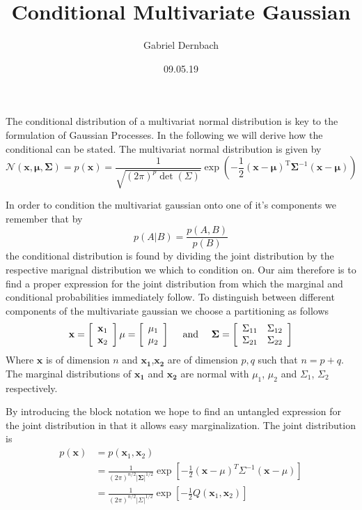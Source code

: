 \documentclass{article}
\title{Conditional Multivariate Gaussian}
\author{Gabriel Dernbach}
\date{09.05.19}
\begin{document}
\maketitle

The conditional distribution of a multivariat normal distribution is key to the formulation of Gaussian Processes. In the following we will derive how the conditional can be stated.
\bigbreak
The multivariat normal distribution is given by
$$\mathcal{N}(\boldsymbol{x},\boldsymbol{\mu}, \mathbf{\Sigma})
= p(\mathbf{x}) = \frac{1}{\sqrt{(2 \pi)^{p} \operatorname{det}(\Sigma)}} \exp \left(-\frac{1}{2}(\mathbf{x}-\boldsymbol{\mu})^{\mathrm{T}} \mathbf{\Sigma}^{-1}(\mathbf{x}-\boldsymbol{\mu})\right)$$

In order to condition the multivariat gaussian onto one of it's components we remember that by
$$p(A|B) = \frac{p(A,B)}{p(B)}$$
the conditional distribution is found by dividing the joint distribution by the respective marignal distribution we which to condition on. Our aim therefore is to find a proper expression for the joint distribution from which the marginal and conditional probabilities immediately follow. 
\bigbreak
To distinguish between different components of the multivariate gaussian we choose a partitioning as follows
$$\mathbf{x}=\left[ \begin{array}{l}{\mathbf{x}_{1}} \\ {\mathbf{x}_{2}}\end{array}\right] \\ \mu=\left[ \begin{array}{c}{\mu_{1}} \\ {\mu_{2}}\end{array}\right] \quad \text { and } \quad {\mathbf{\Sigma}}=\left[ \begin{array}{cc}{\Sigma_{11}} & {\Sigma_{12}} \\ {\Sigma_{21}} & {\Sigma_{22}}\end{array}\right]$$
Where $\mathbf{x}$ is of dimension $n$ and $\mathbf{x_1}$,$\mathbf{x_2}$ are of dimension $p,q$ such that $n = p + q$. The marginal distributions of $\mathbf{x_1}$ and $\mathbf{x_2}$ are normal with $\mu_1$, $\mu_2$ and $\Sigma_1$, $\Sigma_2$ respectively.

By introducing the block notation we hope to find an untangled expression for the joint distribution in that it allows easy marginalization. The joint distribution is
\begin{align*}
	p(\mathbf{x})&=p\left(\mathbf{x}_{1}, \mathbf{x}_{2}\right) \\
		     &=\frac{1}{(2 \pi)^{n / 2}|\mathbf{\Sigma}|^{1 / 2}} \exp \left[-\frac{1}{2}(\mathbf{x}-\mu)^{T} \Sigma^{-1}(\mathbf{x}-\mu)\right] \\
		     &=\frac{1}{(2 \pi)^{n / 2}|\Sigma|^{1 / 2}} \exp \left[-\frac{1}{2} Q\left(\mathbf{x}_{1}, \mathbf{x}_{2}\right)\right]
\end{align*}
\end{document}
